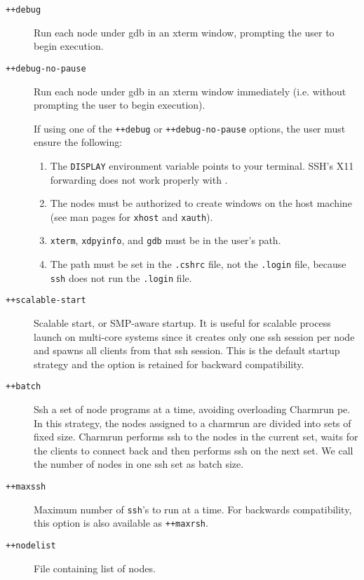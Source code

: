 \begin{description}
\item[{\tt ++debug}] Run each node under gdb in an xterm window, prompting
the user to begin execution.

\item[{\tt ++debug-no-pause}] Run each node under gdb in an xterm window
immediately (i.e. without prompting the user to begin execution).

If using one of the {\tt ++debug} or {\tt ++debug-no-pause} options,
the user must ensure the following:
\begin{enumerate}

\item The {\tt DISPLAY} environment variable points to your terminal.
SSH's X11 forwarding does not work properly with \charmpp{}.

\item The nodes must be authorized to create windows on the host machine (see
man pages for {\tt xhost} and {\tt xauth}).

\item {\tt xterm}, {\tt xdpyinfo},  and {\tt gdb} must be in
the user's path.

\item The path must be set in the {\tt .cshrc} file, not the {\tt .login}
file, because {\tt ssh} does not run the {\tt .login} file.

\end{enumerate}

\item[{\tt ++scalable-start}]   Scalable start, or SMP-aware startup. It is useful for scalable process launch on multi-core systems since it creates only one ssh session per node and spawns all clients from that ssh session. This is the default startup strategy and the option is retained for backward compatibility.

\item[{\tt ++batch}]            Ssh a set of node programs at a time, avoiding overloading Charmrun pe.  In this strategy, the nodes assigned to a charmrun are divided into sets of fixed size. Charmrun performs ssh to the nodes in the current set, waits for the clients to connect back and then performs ssh on the next set. We call the number of nodes in one ssh set as batch size.

\item[{\tt ++maxssh}] Maximum number of {\tt ssh}'s to run at a
time. For backwards compatibility, this option is also available as {\tt ++maxrsh}.

\item[{\tt ++nodelist}] File containing list of nodes.


\end{description}
